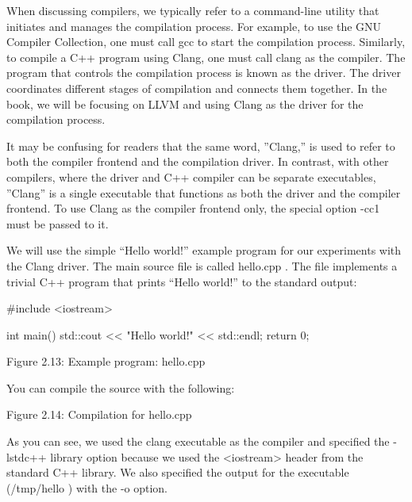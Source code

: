 When discussing compilers, we typically refer to a command-line utility that initiates and manages the compilation process. For example, to use the GNU Compiler Collection, one must call gcc to start the compilation process. Similarly, to compile a C++ program using Clang, one must call clang as the compiler. The program that controls the compilation process is known as the driver. The driver coordinates different stages of compilation and connects them together. In the book, we will be focusing on LLVM and using Clang as the driver for the compilation process.

It may be confusing for readers that the same word, ”Clang,” is used to refer to both the compiler frontend and the compilation driver. In contrast, with other compilers, where the driver and C++ compiler can be separate executables, ”Clang” is a single executable that functions as both the driver and the compiler frontend. To use Clang as the compiler frontend only, the special option -cc1 must be passed to it.


We will use the simple “Hello world!” example program for our experiments with the Clang driver. The main source file is called hello.cpp . The file implements a trivial C++ program that prints “Hello world!” to the standard output:

\begin{cpp}
#include <iostream>

int main() {
  std::cout << "Hello world!" << std::endl;
  return 0;
}
\end{cpp}

\begin{center}
Figure 2.13: Example program: hello.cpp
\end{center}

You can compile the source with the following:


\begin{center}
Figure 2.14: Compilation for hello.cpp
\end{center}

As you can see, we used the clang executable as the compiler and specified the -lstdc++ library option because we used the <iostream> header from the standard C++ library. We also specified the output for the executable (/tmp/hello ) with the -o option.

